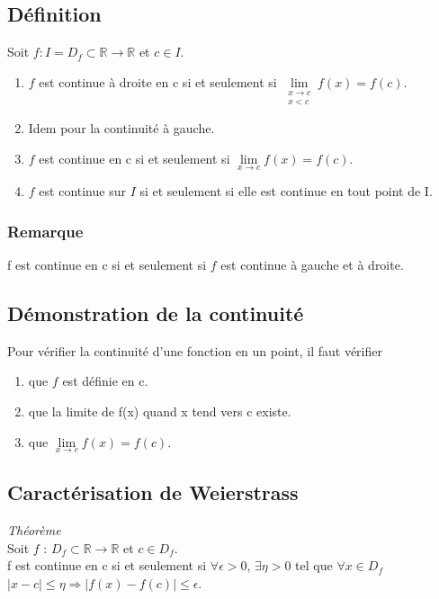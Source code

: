 \documentclass[a4paper,10pt]{book} %
\newcommand{\R}{\mathbb{R}}
\begin{document}
\subsection{Définition}
Soit $f : I=D_{f}\subset\R\rightarrow \R$ et $c\in I$.\\ \begin{enumerate}

\item $f$ est continue à droite en c si et seulement si $\lim\limits_{\substack{ x\rightarrow c \\ x<c}} f(x)=f(c)$.

\item Idem pour la continuité à gauche.\\

\item $f$ est continue en c si et seulement si $\lim\limits_{x\rightarrow c} f(x)=f(c)$.\\

\item $f$ est continue sur $I$ si et seulement si elle est continue en tout point de I. \end{enumerate}

\subsubsection{Remarque}
f est continue en c si et seulement si $f$ est continue à gauche et à droite.

\subsection{Démonstration de la continuité}
Pour vérifier la continuité d'une fonction en un point, il faut vérifier \begin{enumerate}
\item que $f$ est définie en c.
\item que la limite de f(x) quand x tend vers c existe.
\item que $\lim\limits_{x\rightarrow c} f(x)=f(c)$. \end{enumerate}

\subsection{Caractérisation de Weierstrass}
\emph{Théorème}\\

Soit $f$ : $D_{f}\subset \R \rightarrow \R$ et $c \in D_{f}$.\\
f est continue en c si et seulement si $\forall \epsilon>0$, $\exists \eta>0$ tel que $\forall x\in D_{f}$
$|x-c| \leq \eta \Rightarrow |f(x)-f(c)|\leq \epsilon$.
\end{document}
